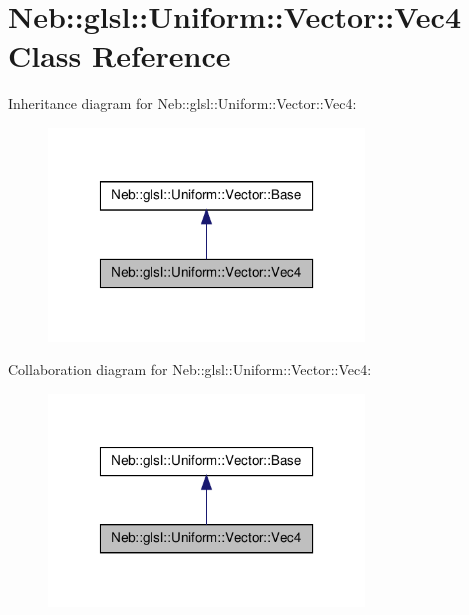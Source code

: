 \hypertarget{classNeb_1_1glsl_1_1Uniform_1_1Vector_1_1Vec4}{\section{\-Neb\-:\-:glsl\-:\-:\-Uniform\-:\-:\-Vector\-:\-:\-Vec4 \-Class \-Reference}
\label{classNeb_1_1glsl_1_1Uniform_1_1Vector_1_1Vec4}
}


\-Inheritance diagram for \-Neb\-:\-:glsl\-:\-:\-Uniform\-:\-:\-Vector\-:\-:\-Vec4\-:\nopagebreak
\begin{figure}[H]
\begin{center}
\leavevmode
\includegraphics[width=238pt]{classNeb_1_1glsl_1_1Uniform_1_1Vector_1_1Vec4__inherit__graph}
\end{center}
\end{figure}


\-Collaboration diagram for \-Neb\-:\-:glsl\-:\-:\-Uniform\-:\-:\-Vector\-:\-:\-Vec4\-:\nopagebreak
\begin{figure}[H]
\begin{center}
\leavevmode
\includegraphics[width=238pt]{classNeb_1_1glsl_1_1Uniform_1_1Vector_1_1Vec4__coll__graph}
\end{center}
\end{figure}
